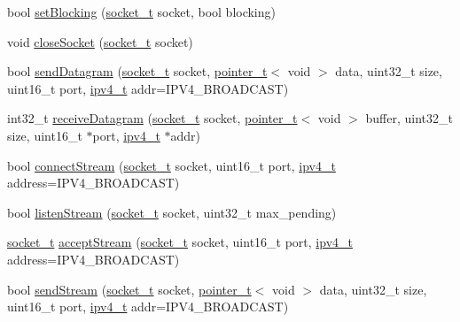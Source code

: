 \begin{DoxyCompactItemize}
bool \hyperlink{namespacecrap_a1c0d503c312ea5243948176f291a7466}{set\+Blocking} (\hyperlink{namespacecrap_af06d7d92e9405fc0750f74417541c2be}{socket\+\_\+t} socket, bool blocking)
\item 
void \hyperlink{namespacecrap_ad38921fa78c05ee48e6d84f215e94942}{close\+Socket} (\hyperlink{namespacecrap_af06d7d92e9405fc0750f74417541c2be}{socket\+\_\+t} socket)
\item 
bool \hyperlink{namespacecrap_aa11b8c210e18da6c0872a7729819872c}{send\+Datagram} (\hyperlink{namespacecrap_af06d7d92e9405fc0750f74417541c2be}{socket\+\_\+t} socket, \hyperlink{structcrap_1_1pointer__t}{pointer\+\_\+t}$<$ void $>$ data, uint32\+\_\+t size, uint16\+\_\+t port, \hyperlink{namespacecrap_a9ef32279067e77955c9f269926a331ee}{ipv4\+\_\+t} addr=I\+P\+V4\+\_\+\+B\+R\+O\+A\+D\+C\+A\+S\+T)
\item 
int32\+\_\+t \hyperlink{namespacecrap_ae04c23b5233e0419d4e96580719b1d7a}{receive\+Datagram} (\hyperlink{namespacecrap_af06d7d92e9405fc0750f74417541c2be}{socket\+\_\+t} socket, \hyperlink{structcrap_1_1pointer__t}{pointer\+\_\+t}$<$ void $>$ buffer, uint32\+\_\+t size, uint16\+\_\+t $\ast$port, \hyperlink{namespacecrap_a9ef32279067e77955c9f269926a331ee}{ipv4\+\_\+t} $\ast$addr)
\item 
bool \hyperlink{namespacecrap_a5e0bc58d8b29215b6ac485631d1713bf}{connect\+Stream} (\hyperlink{namespacecrap_af06d7d92e9405fc0750f74417541c2be}{socket\+\_\+t} socket, uint16\+\_\+t port, \hyperlink{namespacecrap_a9ef32279067e77955c9f269926a331ee}{ipv4\+\_\+t} address=I\+P\+V4\+\_\+\+B\+R\+O\+A\+D\+C\+A\+S\+T)
\item 
bool \hyperlink{namespacecrap_a581e0c516a6931787ca4e76aa05507d2}{listen\+Stream} (\hyperlink{namespacecrap_af06d7d92e9405fc0750f74417541c2be}{socket\+\_\+t} socket, uint32\+\_\+t max\+\_\+pending)
\item 
\hyperlink{namespacecrap_af06d7d92e9405fc0750f74417541c2be}{socket\+\_\+t} \hyperlink{namespacecrap_a0f305300198a9d6dfe53a811ec0b15e7}{accept\+Stream} (\hyperlink{namespacecrap_af06d7d92e9405fc0750f74417541c2be}{socket\+\_\+t} socket, uint16\+\_\+t port, \hyperlink{namespacecrap_a9ef32279067e77955c9f269926a331ee}{ipv4\+\_\+t} address=I\+P\+V4\+\_\+\+B\+R\+O\+A\+D\+C\+A\+S\+T)
\item 
bool \hyperlink{namespacecrap_a56b8d5e7a161ffb6278e62c70101ec24}{send\+Stream} (\hyperlink{namespacecrap_af06d7d92e9405fc0750f74417541c2be}{socket\+\_\+t} socket, \hyperlink{structcrap_1_1pointer__t}{pointer\+\_\+t}$<$ void $>$ data, uint32\+\_\+t size, uint16\+\_\+t port, \hyperlink{namespacecrap_a9ef32279067e77955c9f269926a331ee}{ipv4\+\_\+t} addr=I\+P\+V4\+\_\+\+B\+R\+O\+A\+D\+C\+A\+S\+T)

\end{DoxyCompactItemize}
